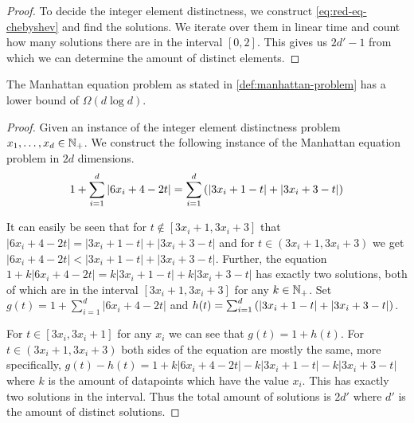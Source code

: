 \begin{proof}
	To decide the integer element distinctness, we construct \cref{eq:red-eq-chebyshev} and find the solutions. We iterate over them in linear time and count how many solutions there are in the interval \([0, 2]\). This gives us \(2d'-1\) from which we can determine the amount of distinct elements.
\end{proof}


\begin{lemma}
	The Manhattan equation problem as stated in \cref{def:manhattan-problem} has a lower bound of \(\Omega(d \log d)\).
\end{lemma}

\begin{proof}
	Given an instance of the integer element distinctness problem \(x_1, \dots, x_d \in \mathbb{N}_+\). We construct the following instance of the Manhattan equation problem in \(2d\) dimensions. 
	\begin{equation}\label{eq:red-eq-manhattan}
		1 + \sum_{i=1}^d |6x_i + 4 - 2t| = \sum_{i=1}^d \left(|3x_i + 1 - t| + |3x_i + 3 - t|\right)
	\end{equation}
	
	It can easily be seen that for \(t \notin [3x_i + 1, 3x_i + 3]\) that \(|6x_i + 4 - 2t| = |3x_i + 1 - t| + |3x_i + 3 - t|\) and for \(t \in (3x_i + 1, 3x_i + 3)\) we get \(|6x_i + 4 - 2t| < |3x_i + 1 - t| + |3x_i + 3 - t|\). Further, the equation \(1 + k|6x_i + 4 - 2t| = k|3x_i + 1 - t| + k|3x_i + 3 - t|\) has exactly two solutions, both of which are in the interval \([3x_i+1,3x_i+3]\) for any \(k \in \mathbb{N}_+\). Set \(g(t) = 1 + \sum_{i=1}^d |6x_i + 4 - 2t|\) and \(h(t) = \sum_{i=1}^d \left(|3x_i + 1 - t| + |3x_i + 3 - t|\right)\).

	For \(t \in [3x_i, 3x_i + 1]\) for any \(x_i\) we can see that \(g(t) = 1 + h(t)\). For \(t \in (3x_i+1, 3x_i + 3)\) both sides of the equation are mostly the same, more specifically, \(g(t)- h(t) = 1 + k|6x_i + 4 - 2t| - k|3x_i + 1 - t| - k|3x_i + 3 - t|\) where \(k\) is the amount of datapoints which have the value \(x_i\). This has exactly two solutions in the interval. Thus the total amount of solutions is \(2d'\) where \(d'\) is the amount of distinct solutions.
\end{proof}



